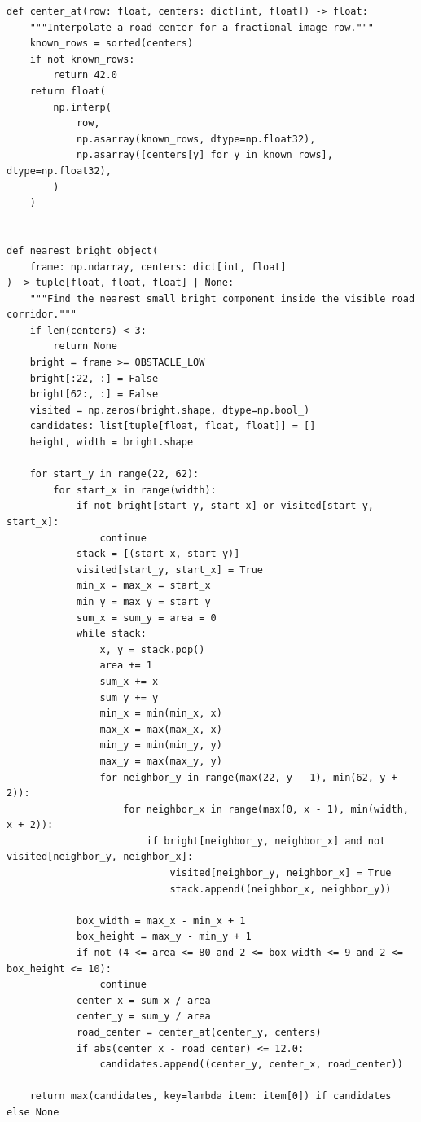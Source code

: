\documentclass[11pt,a4paper]{article}
\begin{document}
\begin{lstlisting}
def center_at(row: float, centers: dict[int, float]) -> float:
    """Interpolate a road center for a fractional image row."""
    known_rows = sorted(centers)
    if not known_rows:
        return 42.0
    return float(
        np.interp(
            row,
            np.asarray(known_rows, dtype=np.float32),
            np.asarray([centers[y] for y in known_rows], dtype=np.float32),
        )
    )


def nearest_bright_object(
    frame: np.ndarray, centers: dict[int, float]
) -> tuple[float, float, float] | None:
    """Find the nearest small bright component inside the visible road corridor."""
    if len(centers) < 3:
        return None
    bright = frame >= OBSTACLE_LOW
    bright[:22, :] = False
    bright[62:, :] = False
    visited = np.zeros(bright.shape, dtype=np.bool_)
    candidates: list[tuple[float, float, float]] = []
    height, width = bright.shape

    for start_y in range(22, 62):
        for start_x in range(width):
            if not bright[start_y, start_x] or visited[start_y, start_x]:
                continue
            stack = [(start_x, start_y)]
            visited[start_y, start_x] = True
            min_x = max_x = start_x
            min_y = max_y = start_y
            sum_x = sum_y = area = 0
            while stack:
                x, y = stack.pop()
                area += 1
                sum_x += x
                sum_y += y
                min_x = min(min_x, x)
                max_x = max(max_x, x)
                min_y = min(min_y, y)
                max_y = max(max_y, y)
                for neighbor_y in range(max(22, y - 1), min(62, y + 2)):
                    for neighbor_x in range(max(0, x - 1), min(width, x + 2)):
                        if bright[neighbor_y, neighbor_x] and not visited[neighbor_y, neighbor_x]:
                            visited[neighbor_y, neighbor_x] = True
                            stack.append((neighbor_x, neighbor_y))

            box_width = max_x - min_x + 1
            box_height = max_y - min_y + 1
            if not (4 <= area <= 80 and 2 <= box_width <= 9 and 2 <= box_height <= 10):
                continue
            center_x = sum_x / area
            center_y = sum_y / area
            road_center = center_at(center_y, centers)
            if abs(center_x - road_center) <= 12.0:
                candidates.append((center_y, center_x, road_center))

    return max(candidates, key=lambda item: item[0]) if candidates else None



\end{lstlisting}
\end{document}

